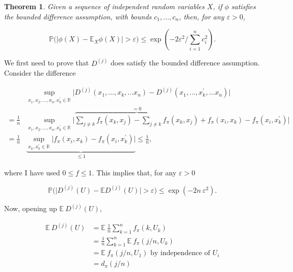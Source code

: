 \documentclass[american, abstract=on]{scrartcl}
\newtheorem{theorem}{Theorem}[section]
\renewcommand{\Re}{\mathbb{R}}
\newcommand{\E}{\mathbb{E}}
\renewcommand{\P}{\mathbb{P}}
\begin{document}
\begin{theorem}
  
  Given a sequence of independent random variables $X$, if $\phi$ satisfies the bounded difference assumption, with bounds $c_1, \ldots, c_n$, then, for any $\varepsilon > 0$,
  
  \begin{equation}
    \P\Big(\lvert \phi(X) - \E_{X} \phi(X) \rvert > \varepsilon \Big) \leq \exp\left(-2\varepsilon^2 \Bigg/ \sum^n_{i = 1} c_i^2 \right).
  \end{equation}
\end{theorem}

We first need to prove that $D^{(j)}$ does satisfy the bounded difference assumption. Consider the difference

\begin{equation*}
  \begin{split}
    &\sup_{x_1, x_2, \ldots, x_n, x_k^\prime \in \Re}  \lvert D^{(j)}(x_1, \ldots, x_k, \ldots x_n) -  D^{(j)}(x_1, \ldots, x_k^\prime, \ldots x_n) \rvert \\
    = \frac{1}{n} &\sup_{x_1, x_2, \ldots, x_n, x_k^\prime \in \Re}  \Bigg\lvert \overbrace{\sum_{j \neq k} f_\pi(x_k, x_j) - \sum_{j \neq k} f_\pi(x_k, x_j)}^{= 0} + f_\pi(x_i, x_k) - f_\pi(x_i, x_k^\prime) \Bigg\rvert \\
    = \frac{1}{n} &\underbrace{\sup_{x_k, x_k^\prime \in \Re} \Big\lvert f_\pi(x_i, x_k) - f_\pi(x_i, x_k^\prime) \Big\rvert}_{\leq 1} \leq \frac{1}{n},
  \end{split}
\end{equation*}

where I have used $0 \leq f \leq 1$. This implies that, for any $\varepsilon > 0$

\begin{equation}
  \P\Big( \lvert D^{(j)}(U) - \E D^{(j)}(U) \rvert > \varepsilon\Big) \leq \exp\left(-2n \ \varepsilon^2 \right).
\end{equation}

Now, opening up $\E \ D^{(j)}(U)$,

\begin{equation}
  \begin{split}
    \E \ D^{(j)}(U) &= \E \ \frac{1}{n} \sum^n_{k = 1} f_{\pi}(k, U_k) \\
    &= \frac{1}{n} \sum^n_{k = 1} \E \ f_{\pi}(j / n, U_k) \\
    &= \E \ f_{\pi}(j / n, U_1) \text{ by independence of } U_i \\
    &= d_\pi(j / n)
  \end{split}
\end{equation}
\end{document}
